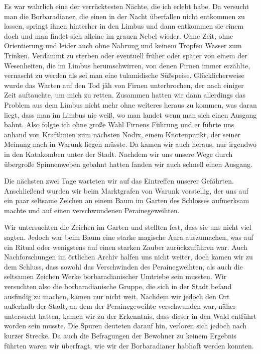 Es war wahrlich eine der verrücktesten Nächte, die ich erlebt habe. Da versucht man die Borbaradianer, die einen in der Nacht überfallen nicht entkommen zu lassen, springt ihnen hinterher in den Limbus und dann entkommen sie einem doch und man findet sich alleine im grauen Nebel wieder. Ohne Zeit, ohne Orientierung und leider auch ohne Nahrung und keinem Tropfen Wasser zum Trinken. Verdammt zu sterben oder eventuell früher oder später von einem der Wesenheiten, die im Limbus herumschwirren, von denen Firnen immer erzählte, vernascht zu werden als sei man eine tulamidische Süßspeise. Glücklicherweise wurde das Warten auf den Tod jäh von Firnen unterbrochen, der nach einiger Zeit auftauchte, um mich zu retten. Zusammen hatten wir dann allerdings das Problem aus dem Limbus nicht mehr ohne weiteres heraus zu kommen, was daran liegt, dass man im Limbus nie weiß, wo man landet wenn man sich einen Ausgang bahnt. Also folgte ich ohne große Wahl Firnens Führung und er führte uns anhand von Kraftlinien zum nächsten Nodix, einem Knotenpunkt, der seiner Meinung nach in Warunk liegen müsste. Da kamen wir auch heraus, nur irgendwo in den Katakomben unter der Stadt. Nachdem wir uns unsere Wege durch übergroße Spinnenweben gebahnt hatten fanden wir auch schnell einen Ausgang.

Die nächsten zwei Tage warteten wir auf das Eintreffen unserer Gefährten. Anschließend wurden wir beim Marktgrafen von Warunk vorstellig, der uns auf ein paar seltsame Zeichen an einem Baum im Garten des Schlosses aufmerksam machte und auf einen verschwundenen Perainegeweihten.

Wir untersuchten die Zeichen im Garten und stellten fest, dass sie uns nicht viel sagten. Jedoch war beim Baum eine starke magische Aura auszumachen, was auf ein Ritual oder wenigstens auf einen starken Zauber zurückzuführen war. Auch Nachforschungen im örtlichen Archiv halfen uns nicht weiter, doch kamen wir zu dem Schluss, dass sowohl das Verschwinden des Perainegweihten, als auch die seltsamen Zeichen Werke borbaradianischer Umtriebe sein mussten. Wir versuchten also die borbaradianische Gruppe, die sich in der Stadt befand ausfindig zu machen, kamen nur nicht weit. Nachdem wir jedoch den Ort außerhalb der Stadt, an dem der Perainegeweihte verschwunden war, näher untersucht hatten, kamen wir zu der Erkenntnis, dass dieser in den Wald entführt worden sein musste. Die Spuren deuteten darauf hin, verloren sich jedoch nach kurzer Strecke. Da auch die Befragungen der Bewohner zu keinem Ergebnis führten waren wir überfragt, wie wir der Borbaradianer habhaft werden konnten.

